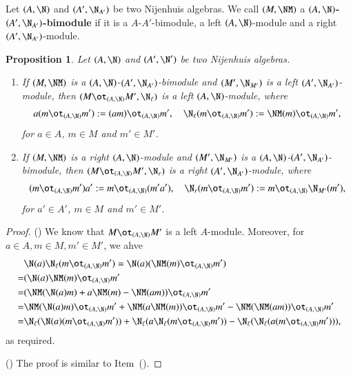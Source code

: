 \documentclass[12pt]{amsart}
\newtheorem{prop}[theorem]{Proposition}
\theoremstyle{definition}
\begin{document}
Let $(A,\N)$ and $(A',\N_{A'})$ be two Nijenhuis algebras. We call $(M,\NM)$ a {\bf $(A,\N)$-$(A',\N_{A'})$-bimodule} if it is a $A$-$A'$-bimodule, a left $(A,\N)$-module and a right $(A',\N_{A'})$-module.

\begin{prop}\label{TP-m}
Let $(A,\N)$ and $(A',\N')$ be two Nijenhuis algebras.
\begin{enumerate}
\item If $(M,\NM)$ is a $(A,\N)$-$(A',\N_{A'})$-bimodule and $(M', \N_{M'})$ is a left $(A',\N_{A'})$-module,
then $(M \ot_{(A,\N)} M',\N_{\ell})$ is a left $(A,\N)$-module, where
\begin{align*}
a(m \ot_{(A,\N)} m'):= (am) \ot_{(A,\N)} m',\quad
\N_{\ell} (m\ot_{(A,\N)} m'):= \NM(m) \ot_{(A,\N)} m',
\end{align*}
for $a \in A$, $m \in M$ and $m' \in M'$.
%
\item If $(M,\NM)$ is a right $(A,\N)$-module and $  (M',\N_{M'})$ is a $(A,\N)$-$(A',\N_{A'})$-bimodule,
then $(M \ot_{(A,\N)} M',\N_{r})$ is a right $(A',\N_{A'})$-module, where
\begin{align*}
(m \ot_{(A, \N)} m')a':= m \ot_{(A,\N)} (m'a'), \quad
\N_r (m\ot_{(A,\N)} m') := m \ot_{(A,\N)} \N_{M'}(m'), 
\end{align*}
for $a' \in A'$, $m \in M$ and $m' \in M'$.
\end{enumerate}
\end{prop}

\begin{proof}
() We know that $M \ot_{(A,\N)} M'$ is a left $A$-module. Moreover, for $a\in A, m\in M, m'\in M'$, we ahve
\begin{align*}
& \N(a) \N_{\ell}(m\ot_{(A,\N)} m')=  \N(a) ( \NM(m) \ot_{(A,\N)} m')\\
%
=& (\N(a) \NM(m) \ot_{(A,\N)} m'\\
%
=& (\NM(\N(a)m) + a \NM(m)-\NM(am)) \ot_{(A,\N)} m' \\ 
%
=& \NM(\N(a) m) \ot_{(A,\N)} m'+ \NM(a \NM(m)) \ot_{(A,\N)} m'- \NM(\NM(am)) \ot_{(A,\N)} m'\\
%
=& \N_{\ell}(\N(a)(m \ot_{(A,\N)} m'))+ \N_{\ell}(a \N_{\ell}(m \ot_{(A,\N)} m'))-\N_{\ell}(\N_{\ell}(a(m \ot_{(A,\N)} m'))),
\end{align*}
as required.

() The proof is similar to Item~().
\end{proof}
\end{document}
